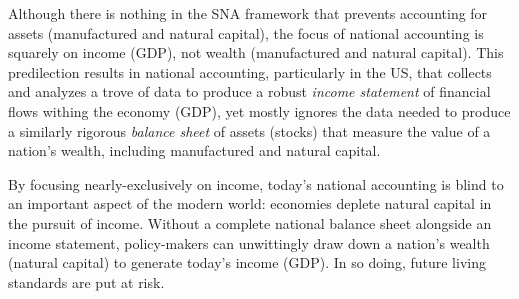
Although there is nothing in the SNA framework that prevents 
accounting for assets (manufactured and natural capital),
the focus of national accounting is squarely on income (GDP), 
not wealth (manufactured and natural capital).\cite[p.~415]{UNSNA2008}  
This predilection results in national accounting,
particularly in the US, that collects and analyzes a trove of data to
produce a robust \emph{income statement} of financial flows withing the economy (GDP),
yet mostly ignores the data needed to produce a similarly rigorous
\emph{balance sheet} of assets (stocks) that measure the value 
of a nation's wealth, including manufactured and natural capital.

By focusing nearly-exclusively on income, 
today's national accounting is blind to an important aspect of the modern world:
economies deplete natural capital in the pursuit of income.
Without a complete national balance sheet alongside an income statement, 
policy-makers can unwittingly draw down a nation's wealth (natural capital) 
to generate today's income (GDP). 
In so doing, future living standards are put at risk. 

